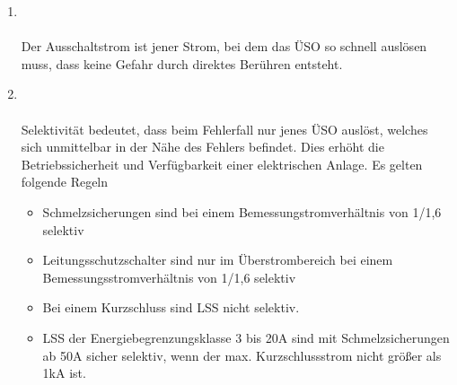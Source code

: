 \begin{enumerate}
    \item   {} \\\\
            Der Ausschaltstrom ist jener Strom, bei dem das ÜSO so schnell auslösen muss, dass keine Gefahr durch direktes Berühren entsteht.
    \item   {} \\\\
            Selektivität bedeutet, dass beim Fehlerfall nur jenes ÜSO auslöst, welches sich unmittelbar in der Nähe des Fehlers befindet. Dies erhöht die Betriebssicherheit und Verfügbarkeit einer 
            elektrischen Anlage. Es gelten folgende Regeln
    
    \begin{itemize}
        \item Schmelzsicherungen sind bei einem Bemessungstromverhältnis von 1/1,6 selektiv 
        \item Leitungsschutzschalter sind nur im Überstrombereich bei einem Bemessungsstromverhältnis von 1/1,6 selektiv
        \item Bei einem Kurzschluss sind LSS nicht selektiv.
        \item LSS der Energiebegrenzungsklasse 3 bis 20A sind mit Schmelzsicherungen ab 50A sicher selektiv, wenn der max. Kurzschlussstrom nicht größer als 1kA ist.
    \end{itemize}
\end{enumerate}